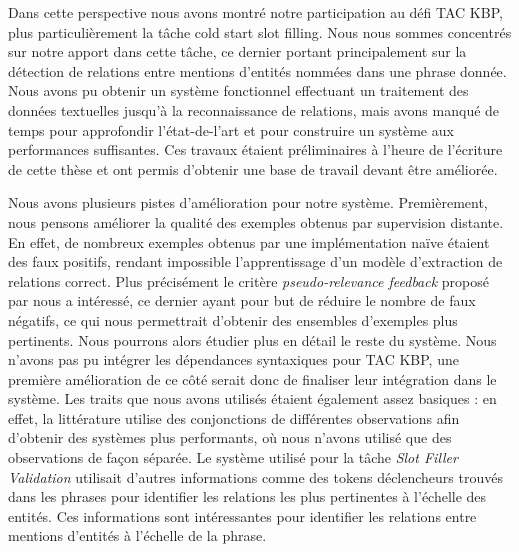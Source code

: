 \documentclass[PhD-Yoann-Dupont.tex]{subfiles}
\begin{document}
Dans cette perspective nous avons montré notre participation au défi TAC KBP, plus particulièrement la tâche cold start slot filling. Nous nous sommes concentrés sur notre apport dans cette tâche, ce dernier portant principalement sur la détection de relations entre mentions d'entités nommées dans une phrase donnée. Nous avons pu obtenir un système fonctionnel effectuant un traitement des données textuelles jusqu'à la reconnaissance de relations, mais avons manqué de temps pour approfondir l'état-de-l'art et pour construire un système aux performances suffisantes. Ces travaux étaient préliminaires à l'heure de l'écriture de cette thèse et ont permis d'obtenir une base de travail devant être améliorée.

Nous avons plusieurs pistes d'amélioration pour notre système. Premièrement, nous pensons améliorer la qualité des exemples obtenus par supervision distante. En effet, de nombreux exemples obtenus par une implémentation naïve étaient des faux positifs, rendant impossible l'apprentissage d'un modèle d'extraction de relations correct. Plus précisément le critère \textit{pseudo-relevance feedback} proposé par \citet{xu2013filling} nous a intéressé, ce dernier ayant pour but de réduire le nombre de faux négatifs, ce qui nous permettrait d'obtenir des ensembles d'exemples plus pertinents. Nous pourrons alors étudier plus en détail le reste du système. Nous n'avons pas pu intégrer les dépendances syntaxiques pour TAC KBP, une première amélioration de ce côté serait donc de finaliser leur intégration dans le système. Les traits que nous avons utilisés étaient également assez basiques : en effet, la littérature utilise des conjonctions de différentes observations afin d'obtenir des systèmes plus performants, où nous n'avons utilisé que des observations de façon séparée. Le système utilisé pour la tâche \textit{Slot Filler Validation} utilisait d'autres informations comme des tokens déclencheurs trouvés dans les phrases pour identifier les relations les plus pertinentes à l'échelle des entités. Ces informations sont intéressantes pour identifier les relations entre mentions d'entités à l'échelle de la phrase.
\end{document}
